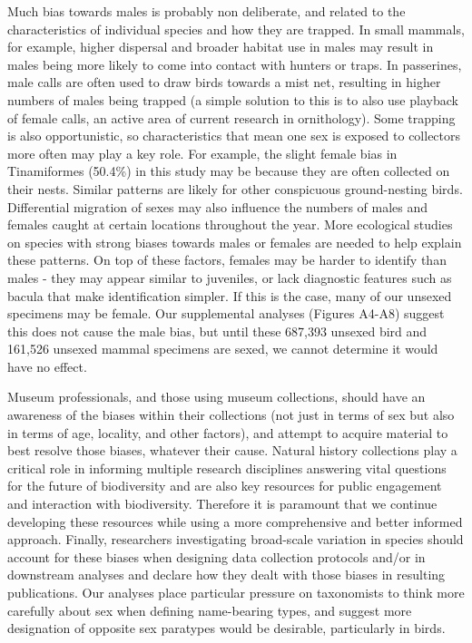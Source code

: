 \documentclass[a4paper, 12pt]{article}
\begin{document}
Much bias towards males is probably non deliberate, and related to the characteristics of individual species and how they are trapped. 
In small mammals, for example, higher dispersal and broader habitat use in males may result in males being more likely to come into contact with hunters or traps\cite{pusey1987sex}. 
In passerines, male calls are often used to draw birds towards a mist net, resulting in higher numbers of males being trapped (a simple solution to this is to also use playback of female calls, an active area of current research in ornithology\cite{femalebirds}).
Some trapping is also opportunistic, so characteristics that mean one sex is exposed to collectors more often may play a key role.
For example, the slight female bias in Tinamiformes (50.4\%) in this study may be because they are often collected on their nests. 
Similar patterns are likely for other conspicuous ground-nesting birds.
Differential migration of sexes may also influence the numbers of males and females caught at certain locations throughout the year\cite{Woodworth2016}.
More ecological studies on species with strong biases towards males or females are needed to help explain these patterns.
On top of these factors, females may be harder to identify than males - they may appear similar to juveniles, or lack diagnostic features such as bacula that make identification simpler.
If this is the case, many of our unsexed specimens may be female. 
Our supplemental analyses (Figures A4-A8) suggest this does not cause the male bias, but until these 687,393 unsexed bird and 161,526 unsexed mammal specimens are sexed, we cannot determine it would have no effect.

Museum professionals, and those using museum collections, should have an awareness of the biases within their collections (not just in terms of sex but also in terms of age, locality, and other factors), and attempt to acquire material to best resolve those biases, whatever their cause. 
Natural history collections play a critical role in informing multiple research disciplines answering vital questions for the future of biodiversity\cite{meineke2018biological} and are also key resources for public engagement and interaction with biodiversity\cite{machin2008}. 
Therefore it is paramount that we continue developing these resources while using a more comprehensive and better informed approach. 
Finally, researchers investigating broad-scale variation in species should account for these biases when designing data collection protocols and/or in downstream analyses and declare how they dealt with those biases in resulting publications. 
Our analyses place particular pressure on taxonomists to think more carefully about sex when defining name-bearing types, and suggest more designation of opposite sex paratypes would be desirable, particularly in birds. 
\end{document}
